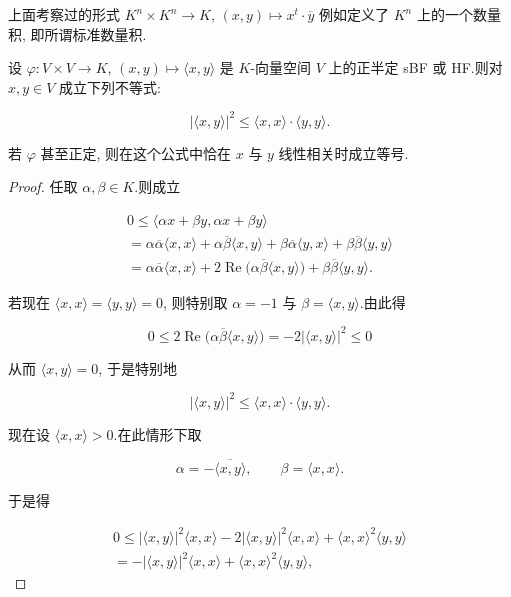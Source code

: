上面考察过的形式 $K^n \times K^n \longrightarrow K$, $(x, y) \longmapsto x^t \cdot \overline{y}$ 例如定义了 $K^n$ 上的一个数量积, 即所谓标准数量积.

\begin{theorem}[柯西-施瓦茨不等式]\label{thm:7.1.4}
设 $\varphi \colon V \times V \longrightarrow K$, $(x, y) \longmapsto \langle x, y \rangle$ 是 $K$-向量空间 $V$ 上的正半定 sBF 或 HF.则对 $x, y \in V$ 成立下列不等式:

\[
|\langle x, y \rangle|^2 \leq \langle x, x \rangle \cdot \langle y, y \rangle\text{.}
\]

若 $\varphi$ 甚至正定, 则在这个公式中恰在 $x$ 与 $y$ 线性相关时成立等号.
\end{theorem}

\begin{proof}
任取 $\alpha, \beta \in K$.则成立

\[
\begin{array}{l}
0 \leq \langle \alpha x + \beta y, \alpha x + \beta y \rangle \\
= \alpha \overline{\alpha} \langle x, x \rangle + \alpha \overline{\beta} \langle x, y \rangle + \beta \overline{\alpha} \langle y, x \rangle + \beta \overline{\beta} \langle y, y \rangle \\
= \alpha \overline{\alpha} \langle x, x \rangle + 2\operatorname{Re}\bigl(\alpha \overline{\beta} \langle x, y \rangle\bigr) + \beta \overline{\beta} \langle y, y \rangle\text{.}
\end{array}
\]

若现在 $\langle x, x \rangle = \langle y, y \rangle = 0$, 则特别取 $\alpha = -1$ 与 $\beta = \langle x, y \rangle$.由此得

\[
0 \leq 2\operatorname{Re}\bigl(\alpha \overline{\beta} \langle x, y \rangle\bigr) = -2|\langle x, y \rangle|^2 \leq 0
\]

从而 $\langle x, y \rangle = 0$, 于是特别地

\[
|\langle x, y \rangle|^2 \leq \langle x, x \rangle \cdot \langle y, y \rangle\text{.}
\]

现在设 $\langle x, x \rangle > 0$.在此情形下取

\[
\alpha = -\overline{\langle x, y \rangle}, \qquad \beta = \langle x, x \rangle\text{.}
\]

于是得

\[
\begin{array}{c}
0 \leq |\langle x, y \rangle|^2 \langle x, x \rangle - 2|\langle x, y \rangle|^2 \langle x, x \rangle + \langle x, x \rangle^2 \langle y, y \rangle \\
= -|\langle x, y \rangle|^2 \langle x, x \rangle + \langle x, x \rangle^2 \langle y, y \rangle,
\end{array}
\]


\end{proof}
